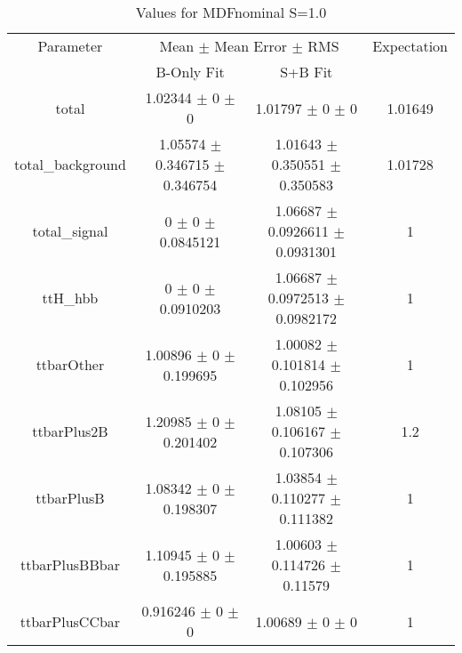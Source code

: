 \begin{table}
\centering
\caption{Values for MDFnominal S=1.0}
\begin{tabular}{cccc}
\toprule
Parameter & \multicolumn{2}{c}{Mean $\pm$ Mean Error $\pm$ RMS} & Expectation\\
 & B-Only Fit & S+B Fit & \\
\midrule
total & \num{1.02344} $\pm$ \num{0} $\pm$ \num{0} & \num{1.01797} $\pm$ \num{0} $\pm$ \num{0} & \num{1.01649}\\
total\_background & \num{1.05574} $\pm$ \num{0.346715} $\pm$ \num{0.346754} & \num{1.01643} $\pm$ \num{0.350551} $\pm$ \num{0.350583} & \num{1.01728}\\
total\_signal & \num{0} $\pm$ \num{0} $\pm$ \num{0.0845121} & \num{1.06687} $\pm$ \num{0.0926611} $\pm$ \num{0.0931301} & \num{1}\\
ttH\_hbb & \num{0} $\pm$ \num{0} $\pm$ \num{0.0910203} & \num{1.06687} $\pm$ \num{0.0972513} $\pm$ \num{0.0982172} & \num{1}\\
ttbarOther & \num{1.00896} $\pm$ \num{0} $\pm$ \num{0.199695} & \num{1.00082} $\pm$ \num{0.101814} $\pm$ \num{0.102956} & \num{1}\\
ttbarPlus2B & \num{1.20985} $\pm$ \num{0} $\pm$ \num{0.201402} & \num{1.08105} $\pm$ \num{0.106167} $\pm$ \num{0.107306} & \num{1.2}\\
ttbarPlusB & \num{1.08342} $\pm$ \num{0} $\pm$ \num{0.198307} & \num{1.03854} $\pm$ \num{0.110277} $\pm$ \num{0.111382} & \num{1}\\
ttbarPlusBBbar & \num{1.10945} $\pm$ \num{0} $\pm$ \num{0.195885} & \num{1.00603} $\pm$ \num{0.114726} $\pm$ \num{0.11579} & \num{1}\\
ttbarPlusCCbar & \num{0.916246} $\pm$ \num{0} $\pm$ \num{0} & \num{1.00689} $\pm$ \num{0} $\pm$ \num{0} & \num{1}\\
\bottomrule
\end{tabular}
\end{table}